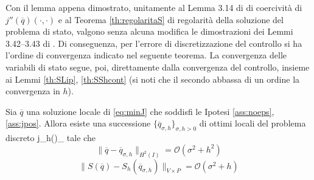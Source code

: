 Con il lemma appena dimostrato, unitamente al Lemma 3.14 di \cite{Kinigera} di coercività di $j''(\overline{q})(\cdot,\cdot)$ e al Teorema \ref{th:regolaritaS} di regolarità della soluzione del problema di stato, valgono senza alcuna modifica le dimostrazioni dei Lemmi 3.42--3.43 di \cite{Kinigera}. Di conseguenza, per l'errore di discretizzazione del controllo si ha l'ordine di convergenza indicato nel seguente teorema. La convergenza delle variabili di stato segue, poi, direttamente dalla convergenza del controllo, insieme ai Lemmi \ref{th:SLip}, \ref{th:SShcont} (si noti che il secondo abbassa di un ordine la convergenza in $h$).
\begin{teor}
	Sia $\overline{q}$ una soluzione locale di \eqref{eq:minJ} che soddisfi le Ipotesi \ref{ass:noeps}, \ref{ass:jpos}. Allora esiste una successione $\{\overline{q}_{\sigma,h}\}_{\sigma,h>0}$ di ottimi locali del problema discreto
	\beq
		 j_h(\qs)\qs\in\Q_\sigma
	\label{eq:minJsigmah}
	\eeq
tale che
	$$\|\overline{q}-\overline{q}_{\sigma,h}\|_{H^2(I)}=\mathcal{O}(\sigma^2+h^2)$$
	$$\|S(\overline{q})-S_h(\overline{q}_{\sigma,h})\|_{V\times P}=\mathcal{O}(\sigma^2+h)$$
\label{th:convq}
\end{teor}
